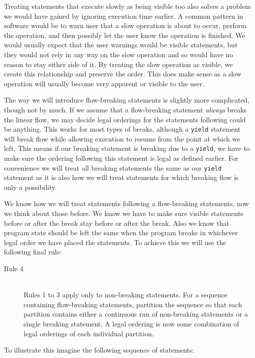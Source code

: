 \documentclass[twoside,a4paper]{report}
\begin{document}
Treating statements that execute slowly as being visible too also solves a problem we would have gained by ignoring execution time earlier. A common
pattern in software would be to warn user that a slow operation is about to occur, perform the operation, and then possibly let the user know the
operation is finished. We would usually expect that the user warnings would be visible statements, but they would not rely in any way on the slow
operation and so would have no reason to stay either side of it. By treating the slow operation as visible, we create this relationship and preserve
the order. This does make sense as a slow operation will usually become very apparent or visible to the user.

The way we will introduce flow-breaking statements is slightly more complicated, though not by much. If we assume that a flow-breaking statement
\textit{always} breaks the linear flow, we may decide legal orderings for the statements following could be anything. This works for most types of
breaks, although a \texttt{yield} statement will break flow while allowing execution to resume from the point at which we left. This means if our
breaking statement is breaking due to a \texttt{yield}, we have to make sure the ordering following this statement is legal as defined earlier.
For convenience we will treat all breaking statements the same as our \texttt{yield} statement as it is also how we will treat statements for which
breaking flow is only a possibility.

We know how we will treat statements following a flow-breaking statements, now we think about those before. We know we have to make sure visible
statements before or after the break stay before or after the break. Also we know that program state should be left the same when the program breaks
in whichever legal order we have placed the statements. To achieve this we will use the following final rule:

\begin{description}
\item[Rule 4] \hfill \\
Rules 1 to 3 apply only to non-breaking statements. For a sequence containing flow-breaking statements, partition the sequence so that each partition
contains either a continuous run of non-breaking statements or a single breaking statement. A legal ordering is now some combination of legal orderings
of each individual partition.
\end{description}

To illustrate this imagine the following sequence of statements:
\end{document}
